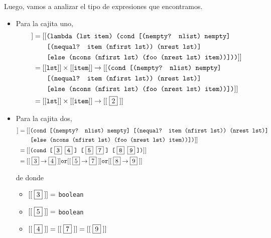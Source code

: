 \documentclass[letterpaper,11pt]{article}
\begin{document}
\begin{enumerate}
    Luego, vamos a analizar el tipo de expresiones que encontramos.
    \begin{itemize}
        \item Para la cajita uno,
        \begin{align*}
            [[\;\fbox{1}\;]]
            &= [[\texttt{(lambda (lst item) (cond [(nempty? nlist) nempty]} \\ 
            &\; \; \; \; \; \; \; \texttt{[(nequal? item (nfirst lst)) 
            (nrest lst)]} \\
            &\; \; \; \; \; \; \; \texttt{[else (ncons (nfirst lst) 
            (foo (nrest lst) item))]))}]] \\ 
            &= [[\texttt{lst}]] \times [[\texttt{item}]] \rightarrow 
            [[\texttt{(cond [(nempty? nlist) nempty]} \\ 
            &\; \; \; \; \; \; \; \texttt{[(nequal? item (nfirst lst)) 
            (nrest lst)]} \\
            &\; \; \; \; \; \; \; \texttt{[else (ncons (nfirst lst) 
            (foo (nrest lst) item))])}]] \\ 
            &= [[\texttt{lst}]] \times [[\texttt{item}]] \rightarrow [[\;\fbox{2}\;]]
        \end{align*}
   
        \item Para la cajita dos, 
        \begin{align*}
            [[\;\fbox{2}\;]] 
            &= [[\texttt{(cond [(nempty? nlist) nempty] [(nequal? item 
            (nfirst lst)) (nrest lst)]} \\ 
            &\; \; \; \; \; \; \; \texttt{[else (ncons (nfirst lst) 
            (foo (nrest lst) item))])}]] \\ 
            &= [[\texttt{(cond [\;\fbox{3} \fbox{4}\;] [\;\fbox{5} \fbox{7}\;] 
            [\;\fbox{8} \fbox{9}\;])}]] \\
            &= [[\;\fbox{3} \rightarrow \fbox{4}\;]] \texttt{or} 
            [[\;\fbox{5} \rightarrow \fbox{7}\;]] \texttt{or}
            [[\;\fbox{8} \rightarrow \fbox{9}\;]]
        \end{align*}

        de donde 
        \begin{itemize}
            \item $[[\;\fbox{3}\;]] =$ \texttt{boolean}
            \item $[[\;\fbox{5}\;]] =$ \texttt{boolean}
            \item $[[\;\fbox{4}\;]] = [[\;\fbox{7}\;]] = [[\;\fbox{9}\;]]$
        \end{itemize}


\end{itemize}
\end{enumerate}
\end{document}

